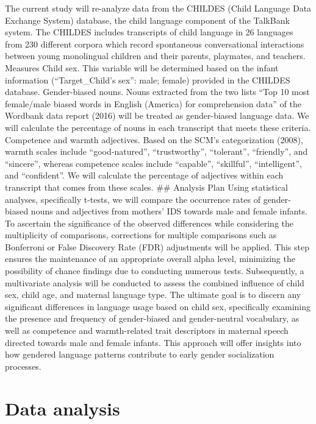 \documentclass[
  man]{apa6}
\begin{document}
The current study will re-analyze data from the CHILDES (Child Language Data Exchange System) database, the child language component of the TalkBank system. The CHILDES includes transcripts of child language in 26 languages from 230 different corpora which record spontaneous conversational interactions between young monolingual children and their parents, playmates, and teachers.
Measures
Child sex. This variable will be determined based on the infant information (``Target\_Child's sex'': male; female) provided in the CHILDES database.
Gender-biased nouns. Nouns extracted from the two lists ``Top 10 most female/male biased words in English (America) for comprehension data'' of the Wordbank data report (2016) will be treated as gender-biased language data. We will calculate the percentage of nouns in each transcript that meets these criteria.
Competence and warmth adjectives. Based on the SCM's categorization (2008), warmth scales include ``good‐natured'', ``trustworthy'', ``tolerant'', ``friendly'', and ``sincere'', whereas competence scales include ``capable'', ``skillful'', ``intelligent'', and ``confident''. We will calculate the percentage of adjectives within each transcript that comes from these scales.
\#\# Analysis Plan
Using statistical analyses, specifically t-tests, we will compare the occurrence rates of gender-biased nouns and adjectives from mothers' IDS towards male and female infants. To ascertain the significance of the observed differences while considering the multiplicity of comparisons, corrections for multiple comparisons such as Bonferroni or False Discovery Rate (FDR) adjustments will be applied. This step ensures the maintenance of an appropriate overall alpha level, minimizing the possibility of chance findings due to conducting numerous tests.
Subsequently, a multivariate analysis will be conducted to assess the combined influence of child sex, child age, and maternal language type.
The ultimate goal is to discern any significant differences in language usage based on child sex, specifically examining the presence and frequency of gender-biased and gender-neutral vocabulary, as well as competence and warmth-related trait descriptors in maternal speech directed towards male and female infants. This approach will offer insights into how gendered language patterns contribute to early gender socialization processes.

\hypertarget{data-analysis}{%
\section{Data analysis}\label{data-analysis}}
\end{document}
